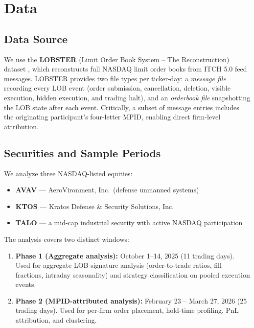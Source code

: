 \documentclass[11pt, letterpaper]{article}
\begin{document}
\section{Data}

\subsection{Data Source}

We use the \textbf{LOBSTER} (Limit Order Book System -- The Reconstruction)
dataset \citep{Huang2011}, which reconstructs full NASDAQ limit order books
from ITCH 5.0 feed messages.
LOBSTER provides two file types per ticker-day: a \emph{message file} recording
every LOB event (order submission, cancellation, deletion, visible execution,
hidden execution, and trading halt), and an \emph{orderbook file} snapshotting
the LOB state after each event.
Critically, a subset of message entries includes the originating participant's
four-letter MPID, enabling direct firm-level attribution.

\subsection{Securities and Sample Periods}

We analyze three NASDAQ-listed equities:
\begin{itemize}[noitemsep]
  \item \textbf{AVAV} --- AeroVironment, Inc.\ (defense unmanned systems)
  \item \textbf{KTOS} --- Kratos Defense \& Security Solutions, Inc.\
  \item \textbf{TALO} --- a mid-cap industrial security with active NASDAQ participation
\end{itemize}

The analysis covers two distinct windows:
\begin{enumerate}[noitemsep]
  \item \textbf{Phase 1 (Aggregate analysis):} October 1--14, 2025 (11 trading days).
    Used for aggregate LOB signature analysis (order-to-trade ratios, fill
    fractions, intraday seasonality) and strategy classification on pooled
    execution events.
  \item \textbf{Phase 2 (MPID-attributed analysis):} February 23 -- March 27, 2026
    (25 trading days). Used for per-firm order placement, hold-time profiling,
    PnL attribution, and clustering.
\end{enumerate}
\end{document}
